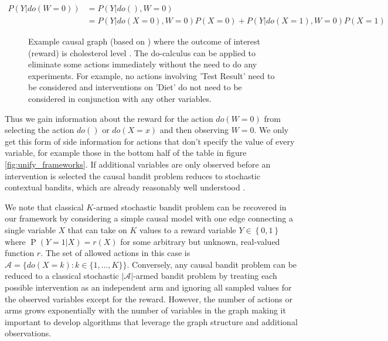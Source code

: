 \documentclass[11pt,a4paper,oneside]{book}
\newcommand{\set}[1]{\left\{#1\right\}}
\newcommand{\eq}[1]{\begin{align*}#1\end{align*}}
\renewcommand{\P}[1]{\operatorname{P}\left(#1\right)}
\theoremstyle{plain}
\theoremstyle{definition}
\begin{document}
\eq{
P(Y|do(W = 0)) &= P(Y|do(),W = 0) \\
&= P(Y|do(X=0),W=0)P(X=0)+P(Y|do(X=1),W=0)P(X=1) 
}

\begin{figure}
\centering
{}
\caption{Example causal graph (based on \citet{Koller2009}) where the outcome of interest (reward) is cholesterol level . The do-calculus can be applied to eliminate some actions immediately without the need to do any experiments. For example, no actions involving 'Test Result' need to be considered and interventions on 'Diet' do not need to be considered in conjunction with any other variables.}
\label{fig:cholesterol_graph}
\end{figure}


Thus we gain information about the reward for the action $do(W=0)$ from selecting the action $do()$ or $do(X = x)$ and then observing $W = 0$.  We only get this form of side information for actions that don't specify the value of every variable, for example those in the bottom half of the table in figure \ref{fig:unify_frameworks}. If additional variables are only observed before an intervention is selected the causal bandit problem reduces to stochastic contextual bandits, which are already reasonably well understood \citep{Agarwal2014}.

We note that classical $K$-armed stochastic bandit problem can be recovered in our framework by considering a simple causal model with one edge connecting a single variable $X$ that can take on $K$ values to a reward variable $Y \in \set{0,1}$ where $\P{Y = 1|X} = r(X)$ for some arbitrary but unknown, real-valued function $r$. The set of allowed actions in this case is $\mathcal{A} = \{ do(X = k) \colon k \in \{1, \ldots, K\}\}$. Conversely, any causal bandit problem can be reduced to a classical stochastic $|\mathcal{A}|$-armed bandit problem by treating each possible intervention as an independent arm and ignoring all sampled values for the observed variables except for the reward. However, the number of actions or arms grows exponentially with the number of variables in the graph making it important to develop algorithms that leverage the graph structure and additional observations.
\end{document}
